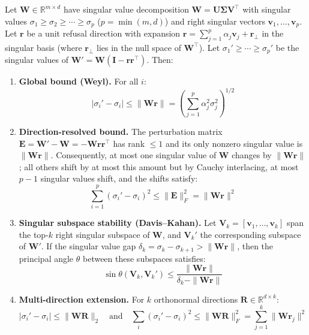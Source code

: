 \begin{theorem}
\label{thm:spectral_cost}
Let $\mathbf{W} \in \mathbb{R}^{m \times d}$ have singular value decomposition $\mathbf{W} = \mathbf{U}\boldsymbol{\Sigma}\mathbf{V}^\top$ with singular values $\sigma_1 \geq \sigma_2 \geq \cdots \geq \sigma_p$ ($p = \min(m,d)$) and right singular vectors $\mathbf{v}_1, \ldots, \mathbf{v}_p$.
Let $\mathbf{r}$ be a unit refusal direction with expansion $\mathbf{r} = \sum_{j=1}^p \alpha_j \mathbf{v}_j + \mathbf{r}_\perp$ in the singular basis (where $\mathbf{r}_\perp$ lies in the null space of $\mathbf{W}^\top$).
Let $\sigma_1' \geq \cdots \geq \sigma_p'$ be the singular values of $\mathbf{W}' = \mathbf{W}(\mathbf{I} - \mathbf{r}\mathbf{r}^\top)$.
Then:

\begin{enumerate}[label=(\roman*)]
    \item \textbf{Global bound (Weyl).} For all $i$:
    \begin{equation}
        |\sigma_i' - \sigma_i| \leq \|\mathbf{W}\mathbf{r}\| = \left(\sum_{j=1}^p \alpha_j^2 \sigma_j^2\right)^{1/2}
    \end{equation}

    \item \textbf{Direction-resolved bound.} The perturbation matrix $\mathbf{E} = \mathbf{W}' - \mathbf{W} = -\mathbf{W}\mathbf{r}\mathbf{r}^\top$ has rank $\leq 1$ and its only nonzero singular value is $\|\mathbf{W}\mathbf{r}\|$.
    Consequently, at most one singular value of $\mathbf{W}$ changes by $\|\mathbf{W}\mathbf{r}\|$; all others shift by at most this amount but by Cauchy interlacing, at most $p-1$ singular values shift, and the shifts satisfy:
    \begin{equation}
        \sum_{i=1}^p (\sigma_i' - \sigma_i)^2 \leq \|\mathbf{E}\|_F^2 = \|\mathbf{W}\mathbf{r}\|^2
    \end{equation}

    \item \textbf{Singular subspace stability (Davis--Kahan).} Let $\mathbf{V}_k = [\mathbf{v}_1, \ldots, \mathbf{v}_k]$ span the top-$k$ right singular subspace of $\mathbf{W}$, and $\mathbf{V}_k'$ the corresponding subspace of $\mathbf{W}'$.
    If the singular value gap $\delta_k = \sigma_k - \sigma_{k+1} > \|\mathbf{W}\mathbf{r}\|$, then the principal angle $\theta$ between these subspaces satisfies:
    \begin{equation}
        \sin \theta(\mathbf{V}_k, \mathbf{V}_k') \leq \frac{\|\mathbf{W}\mathbf{r}\|}{\delta_k - \|\mathbf{W}\mathbf{r}\|}
    \end{equation}

    \item \textbf{Multi-direction extension.} For $k$ orthonormal directions $\mathbf{R} \in \mathbb{R}^{d \times k}$:
    \begin{equation}
        |\sigma_i' - \sigma_i| \leq \|\mathbf{W}\mathbf{R}\|_2 \quad \text{and} \quad \sum_i (\sigma_i' - \sigma_i)^2 \leq \|\mathbf{W}\mathbf{R}\|_F^2 = \sum_{j=1}^k \|\mathbf{W}\mathbf{r}_j\|^2
    \end{equation}
\end{enumerate}
\end{theorem}

